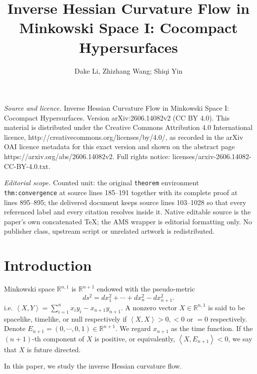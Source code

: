 \documentclass[10pt,a4paper]{amsart}
\newcommand{\R}{\ensuremath{\mathbb{R}}}
\newcommand{\ip}[2]{\ensuremath{\left< {#1}, {#2} \right>}}
\numberwithin{equation}{section}
\begin{document}
\title[Inverse Hessian Curvature Flow in Minkowski Space I: Cocompa]{Inverse Hessian Curvature Flow in Minkowski Space I: Cocompact Hypersurfaces}
\author{Dake Li, Zhizhang Wang; Shiqi Yin}
\date{}
\maketitle
\noindent\emph{Source and licence.} Inverse Hessian Curvature Flow in Minkowski Space I: Cocompact Hypersurfaces. Version arXiv:2606.14082v2 (CC BY 4.0). This material is distributed under the Creative Commons Attribution 4.0 International licence, http://creativecommons.org/licenses/by/4.0/, as recorded in the arXiv OAI licence metadata for this exact version and shown on the abstract page https://arxiv.org/abs/2606.14082v2. Full rights notice: licenses/arxiv-2606.14082-CC-BY-4.0.txt.\par\smallskip
\noindent\textit{Editorial scope.} Counted unit: the original \texttt{theorem} environment \texttt{thm:convergence} at source lines 185--191 together with its complete proof at lines 895--895; the delivered document keeps source lines 103--1028 so that every referenced label and every citation resolves inside it. Native editable source is the paper's own concatenated TeX; the AMS wrapper is editorial formatting only. No publisher class, upstream script or unrelated artwork is redistributed.
\section{Introduction}
Minkowski space \(\R^{n,1}\) is  \(\R^{n+1}\) endowed with the pseudo-metric 
\[ ds^2 = dx_1^2 +\cdots + dx_n^2 - dx_{n+1}^2. \] i.e. \(\ip{X}{Y} = \sum_{i=1}^{n}x_i y_i - x_{n+1}y_{n+1}\). A nonzero vector \(X \in \R^{n,1}\) is said to be spacelike, timelike, or null respectively if \(\ip{X}{X} > 0, < 0\) or \(=0\) respectively. Denote \(E_{n+1} = (0,\cdots,0,1)\in \R^{n+1}\). We regard \(x_{n+1}\) as the time function. If the  \((n+1)\)-th component of \(X\) is positive, or equivalently, \(\ip{X}{E_{n+1}} < 0\), we say that \(X\) is future directed. 
\par In this paper, we study the inverse Hessian curvature flow. 
\end{document}
